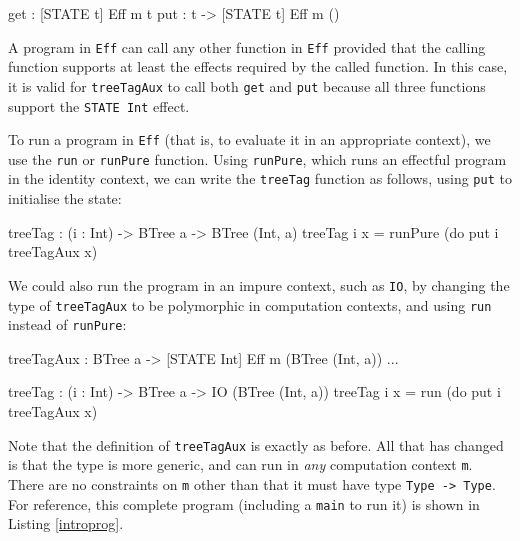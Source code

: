 \begin{code}
get :      { [STATE t] } Eff m t
put : t -> { [STATE t] } Eff m () 
\end{code}

\noindent
A program in \texttt{Eff} can call any other function in \texttt{Eff} provided
that the calling function supports at least the effects required by the called
function. In this case, it is valid for \texttt{treeTagAux} to call both
\texttt{get} and \texttt{put} because all three functions support the
\texttt{STATE Int} effect.

To run a program in \texttt{Eff} (that is, to evaluate it in an appropriate
context), we use the \texttt{run} or \texttt{runPure} function. Using 
\texttt{runPure}, which runs an effectful program in the identity context,
we can write the \texttt{treeTag} function as follows, using \texttt{put}
to initialise the state:

\begin{code}
treeTag : (i : Int) -> BTree a -> BTree (Int, a)
treeTag i x = runPure (do put i
                          treeTagAux x)
\end{code}

\noindent
We could also run the program in an impure context, such as \texttt{IO},
by changing the type of \texttt{treeTagAux} to be polymorphic in computation
contexts, and using \texttt{run} instead of \texttt{runPure}:

\begin{code}
treeTagAux : BTree a -> { [STATE Int] } Eff m (BTree (Int, a))
...

treeTag : (i : Int) -> BTree a -> IO (BTree (Int, a))
treeTag i x = run (do put i
                      treeTagAux x)
\end{code}

\noindent
Note that the definition of \texttt{treeTagAux} is exactly as before. All that
has changed is that the type is more generic, and can run in \emph{any}
computation context \texttt{m}. There are no constraints on \texttt{m} other
than that it must have type \texttt{Type -> Type}. For reference, this
complete program (including a \texttt{main} to run it) is shown in
Listing \ref{introprog}.



